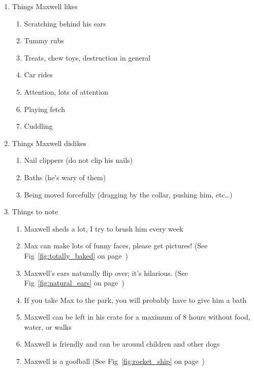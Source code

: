 \documentclass[pdftex,12pt]{article}
\begin{document}
\begin{enumerate}\label{itm:other_information}
    \item Things Maxwell likes
        \begin{enumerate}
            \item Scratching behind his ears
            \item Tummy rubs
            \item Treats, chew toys, destruction in general
            \item Car rides
            \item Attention, lots of attention
            \item Playing fetch
            \item Cuddling
        \end{enumerate}
    \item Things Maxwell dislikes
        \begin{enumerate}
            \item Nail clippers (do not clip his nails)
            \item Baths (he's wary of them)
            \item Being moved forcefully (dragging by the collar, pushing him,
                etc\ldots)
        \end{enumerate}
    \item Things to note
        \begin{enumerate}
            \item Maxwell sheds a lot, I try to brush him every week
            \item Max can make lots of funny faces, please get pictures! (See
                Fig~\ref{fig:totally_baked} on page~\pageref{fig:totally_baked})
            \item Maxwell's ears naturally flip over; it's hilarious. (See
                Fig~\ref{fig:natural_ears} on page~\pageref{fig:natural_ears})
            \item If you take Max to the park, you will probably have to give
                him a bath
            \item Maxwell can be left in his crate for a maximum of 8 hours
                without food, water, or walks
            \item Maxwell is friendly and can be around children and other dogs
            \item Maxwell is a goofball (See Fig~\ref{fig:rocket_ship} on
                page~\pageref{fig:rocket_ship})
        \end{enumerate}
\end{enumerate}
\end{document}
